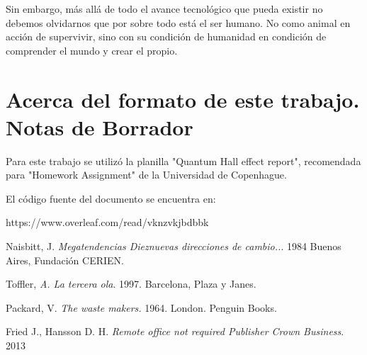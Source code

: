 \documentclass[a4paper, 12pt]{article}
\begin{document}
Sin embargo, más allá de todo el avance tecnológico que pueda existir no debemos olvidarnos que por sobre todo está el ser humano. No como animal en acción de supervivir, sino con su condición de humanidad en condición de comprender el mundo y crear el propio.



\section{Acerca del formato de este trabajo. Notas de Borrador}
Para este trabajo se utilizó la planilla "Quantum Hall effect report", recomendada para "Homework Assignment" de la Universidad de Copenhague.

El código fuente del documento se encuentra en:

https://www.overleaf.com/read/vknzvkjbdbbk

\begin{thebibliography}{9}

Naisbitt, J. \emph{Megatendencias Dieznuevas direcciones de cambio..}. 1984 Buenos Aires, Fundación CERIEN.

Toffler, \emph{A. La tercera ola}. 1997. Barcelona, Plaza y Janes. 


Packard, V. \emph{The waste makers.} 1964. London. Penguin Books.


Fried J., Hansson D. H. \emph{Remote office not required Publisher Crown Business}. 2013 
\end{thebibliography}
\end{document}
